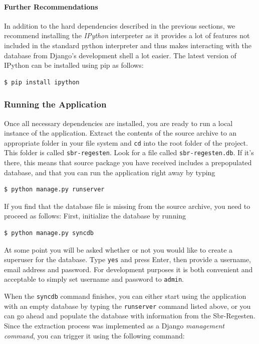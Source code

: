 \paragraph{Further Recommendations}
In addition to the hard dependencies described in the previous
sections, we recommend installing the \emph{IPython} interpreter as it
provides a lot of features not included in the standard python
interpreter and thus makes interacting with the database from Django's
development shell a lot easier. The latest version of IPython can be
installed using pip as follows:

\begin{verbatim}
$ pip install ipython
\end{verbatim}

\subsubsection{Running the Application}
\label{sec:run}

Once all necessary dependencies are installed, you are ready to run a
local instance of the application. Extract the contents of the source
archive to an appropriate folder in your file system and \texttt{cd}
into the root folder of the project. This folder is called
\texttt{sbr-regesten}. Look for a file called
\texttt{sbr-regesten.db}. If it's there, this means that source
package you have received includes a prepopulated database, and that
you can run the application right away by typing

\begin{verbatim}
$ python manage.py runserver
\end{verbatim}

If you find that the database file is missing from the source archive,
you need to proceed as follows: First, initialize the database by running

\begin{verbatim}
$ python manage.py syncdb
\end{verbatim}

At some point you will be asked whether or not you would like to
create a superuser for the database. Type \texttt{yes} and press
Enter, then provide a username, email address and password. For
development purposes it is both convenient and acceptable to simply
set username and password to \texttt{admin}.

When the \texttt{syncdb} command finishes, you can either start using
the application with an empty database by typing the
\texttt{runserver} command listed above, or you can go ahead and
populate the database with information from the Sbr-Regesten. Since
the extraction process was implemented as a Django \emph{management command},
you can trigger it using the following command:

